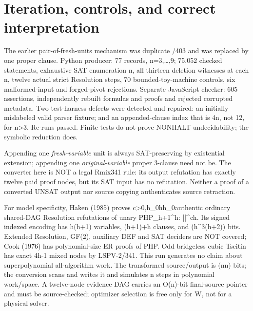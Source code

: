 \documentclass[11pt]{article}
\begin{document}
\section*{Iteration, controls, and correct interpretation}
The earlier pair-of-fresh-units mechanism was duplicate /403 and was replaced by one proper clause. Python producer: 77 records, n=3,\dots,9; 75,052 checked statements, exhaustive SAT enumeration n, all thirteen deletion witnesses at each n, twelve actual strict Resolution steps, 70 bounded-toy-machine controls, six malformed-input and forged-pivot rejections. Separate JavaScript checker: 605 assertions, independently rebuilt formulas and proofs and rejected corrupted metadata. Two test-harness defects were detected and repaired: an initially mislabeled valid parser fixture; and an appended-clause index that is 4n, not 12, for n>3. Re-runs passed. Finite tests do not prove NONHALT undecidability; the symbolic reduction does.

Appending one \emph{fresh-variable} unit is always SAT-preserving by existential extension; appending one \emph{original-variable} proper 3-clause need not be. The converter here is NOT a legal Rmix341 rule: its output refutation has exactly twelve paid proof nodes, but its SAT input has no refutation. Neither a proof of a converted UNSAT output nor source copying authenticates source retraction.

For model specificity, Haken (1985) proves \exists c>0,h_0\forall h\ge h_0\forall authentic ordinary shared-DAG Resolution refutations \pi of unary PHP_{h+1}^h: |\pi|^{ch}. Its signed indexed encoding has h(h+1) variables, (h+1)+h clauses, and \Theta(h^3\log(h+2)) bits. Extended Resolution, GF(2), auxiliary DEF and SAT deciders are NOT covered; Cook (1976) has polynomial-size ER proofs of PHP. Odd bridgeless cubic Tseitin has exact 4h-1 mixed nodes by LSPV-2/341. This run generates no claim about superpolynomial all-algorithm work. The transformed source/output is \Theta(n\log n) bits; the conversion scans and writes it and simulates n steps in polynomial work/space. A twelve-node evidence DAG carries an O(\log n)-bit final-source pointer and must be source-checked; optimizer selection is free only for W, not for a physical solver.
\end{document}
